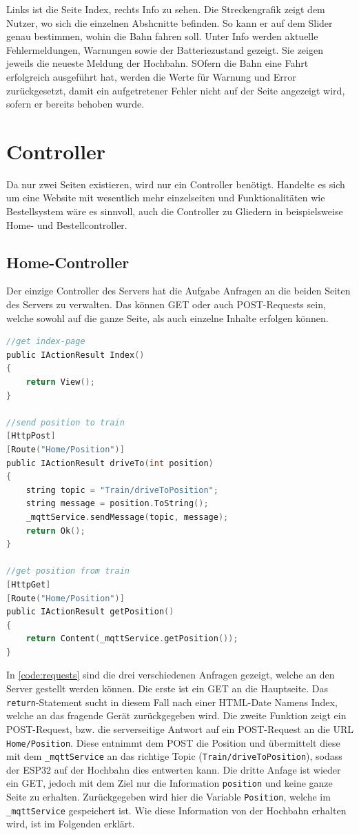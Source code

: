 Links ist die Seite Index, rechts Info zu sehen. Die Streckengrafik zeigt dem Nutzer, wo sich die einzelnen Abshcnitte befinden. So kann er auf dem Slider genau bestimmen, wohin die Bahn fahren soll. Unter Info werden aktuelle Fehlermeldungen, Warnungen sowie der Batteriezustand gezeigt. Sie zeigen jeweils die neueste Meldung der Hochbahn. SOfern die Bahn eine Fahrt erfolgreich ausgeführt hat, werden die Werte für Warnung und Error zurückgesetzt, damit ein aufgetretener Fehler nicht auf der Seite angezeigt wird, sofern er bereits behoben wurde. 

\section{Controller}
\label{sec:controller}
Da nur zwei Seiten existieren, wird nur ein Controller benötigt. Handelte es sich um eine Website mit wesentlich mehr einzelseiten und Funktionalitäten wie Bestellsystem wäre es sinnvoll, auch die Controller zu Gliedern in beispielsweise Home- und Bestellcontroller. \\
\subsection{Home-Controller}
Der einzige Controller des Servers hat die Aufgabe Anfragen an die beiden Seiten des Servers zu verwalten. Das können GET oder auch POST-Requests sein, welche sowohl auf die ganze Seite, als auch einzelne Inhalte erfolgen können.

\begin{lstlisting}[language=c, style=dhpaperdefault]
//get index-page
public IActionResult Index()
{
	return View();
}

//send position to train
[HttpPost]
[Route("Home/Position")]
public IActionResult driveTo(int position)
{
	string topic = "Train/driveToPosition";
	string message = position.ToString();
	_mqttService.sendMessage(topic, message);
	return Ok();
}

//get position from train
[HttpGet]
[Route("Home/Position")]
public IActionResult getPosition()
{
	return Content(_mqttService.getPosition());
}
\end{lstlisting}
\vspace{0.5cm}

In \autoref{code:requests} sind die drei verschiedenen Anfragen gezeigt, welche an den Server gestellt werden können. Die erste ist ein GET an die Hauptseite. Das \texttt{return}-Statement sucht in diesem Fall nach einer HTML-Date Namens Index, welche an das fragende Gerät zurückgegeben wird. Die zweite Funktion zeigt ein POST-Request, bzw. die serverseitige Antwort auf ein POST-Request an die URL \texttt{Home/Position}. Diese entnimmt dem POST die Position und übermittelt diese mit dem \texttt{\_mqttService} an das richtige Topic (\texttt{Train/driveToPosition}), sodass der ESP32 auf der Hochbahn dies entwerten kann. Die dritte Anfage ist wieder ein GET, jedoch mit dem Ziel nur die Information \texttt{position} und keine ganze Seite zu erhalten. Zurückgegeben wird hier die Variable \texttt{Position}, welche im \texttt{\_mqttService} gespeichert ist. Wie diese Information von der Hochbahn erhalten wird, ist im Folgenden erklärt.
